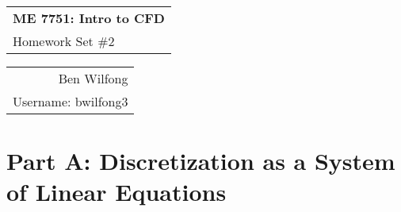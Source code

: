 \documentclass[reqno, 12pt]{amsart}
\def\name{Ben Wilfong} %
\def\ID{bwilfong3} %
\begin{document}
	\noindent
	\thispagestyle{firststyle}
	\begin{tabular}{l}
		{\LARGE \textbf{ME 7751: Intro to CFD} }\\
		{\Large Homework Set \#2}
	\end{tabular} \hfill \begin{tabular}{r}
		\name \\
		Username: \ID
	\end{tabular}
	\noindent\makebox[\linewidth]{\rule{\textwidth}{1pt}}

    \section{Part A: Discretization as a System of Linear Equations}
\end{document}
